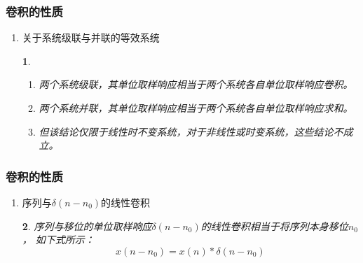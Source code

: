 \documentclass[notheorems,compress,mathserif,table]{beamer}
\newtheorem{dablock}{}
\begin{document}
\begin{frame}\frametitle{卷积的性质}%
\begin{enumerate}
  \item[(2)]  关于系统级联与并联的等效系统
         \begin{dablock}
            \begin{enumerate}
               \item 两个系统级联，其单位取样响应相当于两个系统各自单位取样响应卷积。
               \item 两个系统并联，其单位取样响应相当于两个系统各自单位取样响应求和。
               \item 但该结论仅限于线性时不变系统，对于非线性或时变系统，这些结论不成立。
            \end{enumerate}
          \end{dablock}
\end{enumerate}
\end{frame}



\begin{frame}\frametitle{卷积的性质}%
\begin{enumerate}
  \item [(3)]  序列与$\delta(n-n_{0})$的线性卷积
         \begin{dablock}
         序列与移位的单位取样响应$\delta(n-n_{0})$的线性卷积相当于将序列本身移位$n_{0}$，
      如下式所示：$$x(n-n_{0})=x(n)*\delta(n-n_{0})$$
      \end{dablock}
\end{enumerate}

\end{frame}
\end{document}
